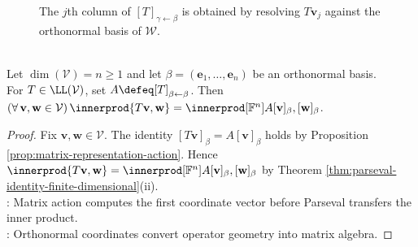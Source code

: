 \begin{figure}[H]
  \centering
  
  \caption{The $j$th column of $[T]_{\gamma\leftarrow\beta}$ is obtained by resolving $T\mathbf{v}_j$ against the orthonormal basis of $\mathcal{W}$.}
  \label{fig:orthonormal-matrix-entries}
\end{figure}

\begin{corollary} \label{cor:inner-product-through-operator-matrix} \\
Let $\dim(\mathcal{V})=n\geq1$ and let $\beta=(\mathbf{e}_1,\ldots,\mathbf{e}_n)$ be an orthonormal basis.\\
For $T\in\LL(\mathcal{V})$, set $A\defeq[T]_{\beta\leftarrow\beta}$. Then $(\forall\,\mathbf{v},\mathbf{w}\in\mathcal{V})\,\innerprod{T\mathbf{v},\mathbf{w}}=\innerprod[\mathbb{F}^n]{A[\mathbf{v}]_{\beta},[\mathbf{w}]_{\beta}}$.
\begin{proof}
Fix $\mathbf{v},\mathbf{w}\in\mathcal{V}$. The identity $[T\mathbf{v}]_{\beta}=A[\mathbf{v}]_{\beta}$ holds by Proposition \ref{prop:matrix-representation-action}. Hence $\innerprod{T\mathbf{v},\mathbf{w}}=\innerprod[\mathbb{F}^n]{A[\mathbf{v}]_{\beta},[\mathbf{w}]_{\beta}}$ by Theorem \ref{thm:parseval-identity-finite-dimensional}(ii).\\
: Matrix action computes the first coordinate vector before Parseval transfers the inner product.\\
: Orthonormal coordinates convert operator geometry into matrix algebra.
\end{proof}
\end{corollary}
